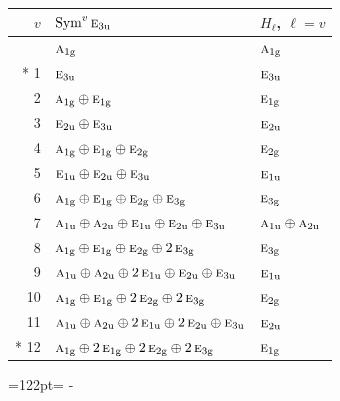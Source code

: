 \documentclass[10pt,a4paper]{article}
\newcommand{\needspace}[1]{\par\penalty-100\begingroup\dimen0=#1\relax\dimen2=\pagegoal
  \advance\dimen2-\pagetotal\ifdim\dimen0>\dimen2\relax\ifdim\dimen2>0pt\vfil\break\fi\fi
  \endgroup}
\numberwithin{equation}{section}
\newcommand{\irr}[1]{\text{\normalfont\scshape #1}}
\newcommand{\ptag}[1]{\mathrm{#1}}
\begin{document}
{\small\begin{longtable}{@{}rll@{}}\toprule
$v$ & $\operatorname{Sym}^{v}\irr{e}_{3\ptag{u}}$ & $H_\ell$, $\ell = v$\\\midrule\endhead
\bottomrule\endfoot\endlastfoot
0 & $\irr{a}_{1\ptag{g}}$ & $\irr{a}_{1\ptag{g}}$\\*
1 & $\irr{e}_{3\ptag{u}}$ & $\irr{e}_{3\ptag{u}}$\\
2 & $\irr{a}_{1\ptag{g}} \oplus \irr{e}_{1\ptag{g}}$ & $\irr{e}_{1\ptag{g}}$\\
3 & $\irr{e}_{2\ptag{u}} \oplus \irr{e}_{3\ptag{u}}$ & $\irr{e}_{2\ptag{u}}$\\
4 & $\irr{a}_{1\ptag{g}} \oplus \irr{e}_{1\ptag{g}} \oplus \irr{e}_{2\ptag{g}}$ & $\irr{e}_{2\ptag{g}}$\\
5 & $\irr{e}_{1\ptag{u}} \oplus \irr{e}_{2\ptag{u}} \oplus \irr{e}_{3\ptag{u}}$ & $\irr{e}_{1\ptag{u}}$\\
6 & $\irr{a}_{1\ptag{g}} \oplus \irr{e}_{1\ptag{g}} \oplus \irr{e}_{2\ptag{g}} \oplus \irr{e}_{3\ptag{g}}$ & $\irr{e}_{3\ptag{g}}$\\
7 & $\irr{a}_{1\ptag{u}} \oplus \irr{a}_{2\ptag{u}} \oplus \irr{e}_{1\ptag{u}} \oplus \irr{e}_{2\ptag{u}} \oplus \irr{e}_{3\ptag{u}}$ & $\irr{a}_{1\ptag{u}} \oplus \irr{a}_{2\ptag{u}}$\\
8 & $\irr{a}_{1\ptag{g}} \oplus \irr{e}_{1\ptag{g}} \oplus \irr{e}_{2\ptag{g}} \oplus 2\,\irr{e}_{3\ptag{g}}$ & $\irr{e}_{3\ptag{g}}$\\
9 & $\irr{a}_{1\ptag{u}} \oplus \irr{a}_{2\ptag{u}} \oplus 2\,\irr{e}_{1\ptag{u}} \oplus \irr{e}_{2\ptag{u}} \oplus \irr{e}_{3\ptag{u}}$ & $\irr{e}_{1\ptag{u}}$\\
10 & $\irr{a}_{1\ptag{g}} \oplus \irr{e}_{1\ptag{g}} \oplus 2\,\irr{e}_{2\ptag{g}} \oplus 2\,\irr{e}_{3\ptag{g}}$ & $\irr{e}_{2\ptag{g}}$\\
11 & $\irr{a}_{1\ptag{u}} \oplus \irr{a}_{2\ptag{u}} \oplus 2\,\irr{e}_{1\ptag{u}} \oplus 2\,\irr{e}_{2\ptag{u}} \oplus \irr{e}_{3\ptag{u}}$ & $\irr{e}_{2\ptag{u}}$\\*
12 & $\irr{a}_{1\ptag{g}} \oplus 2\,\irr{e}_{1\ptag{g}} \oplus 2\,\irr{e}_{2\ptag{g}} \oplus 2\,\irr{e}_{3\ptag{g}}$ & $\irr{e}_{1\ptag{g}}$\\
\bottomrule\end{longtable}}
\needspace{122pt}
\end{document}
